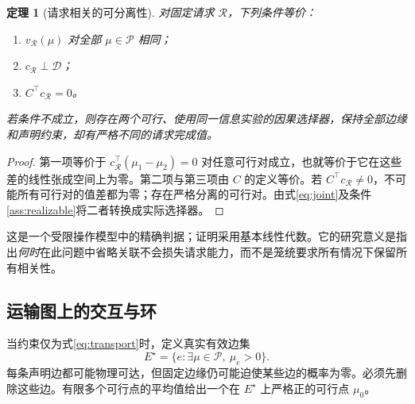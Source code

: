 \documentclass[UTF8,11pt,a4paper,fontset=fandol]{ctexart}
\numberwithin{equation}{section}
\newtheorem{theorem}{定理}[section]
\theoremstyle{definition}
\begin{document}
\begin{theorem}[请求相关的可分离性]
\label{thm:separable}
对固定请求 $\mathcal R$，下列条件等价：
\begin{enumerate}
\item $v_{\mathcal R}(\mu)$ 对全部 $\mu\in\mathcal P$ 相同；
\item $c_{\mathcal R}\perp\mathcal D$；
\item $C^\top c_{\mathcal R}=0$。
\end{enumerate}
若条件不成立，则存在两个可行、使用同一信息实验的因果选择器，保持全部边缘和声明约束，却有严格不同的请求完成值。
\end{theorem}
\begin{proof}
第一项等价于 $c_{\mathcal R}^\top(\mu_1-\mu_2)=0$ 对任意可行对成立，也就等价于它在这些差的线性张成空间上为零。第二项与第三项由 $C$ 的定义等价。若 $C^\top c_{\mathcal R}\ne0$，不可能所有可行对的值差都为零；存在严格分离的可行对。由式\eqref{eq:joint}及条件\ref{ass:realizable}将二者转换成实际选择器。\end{proof}

这是一个受限操作模型中的精确判据；证明采用基本线性代数。它的研究意义是指出\emph{何时}在此问题中省略关联不会损失请求能力，而不是笼统要求所有情况下保留所有相关性。

\subsection{运输图上的交互与环}
当约束仅为式\eqref{eq:transport}时，定义真实有效边集
\begin{equation}
E^\star=\{e:\exists\mu\in\mathcal P,\ \mu_e>0\}.
\end{equation}
每条声明边都可能物理可达，但固定边缘仍可能迫使某些边的概率为零。必须先删除这些边。有限多个可行点的平均值给出一个在 $E^\star$ 上严格正的可行点 $\mu_0$。
\end{document}
